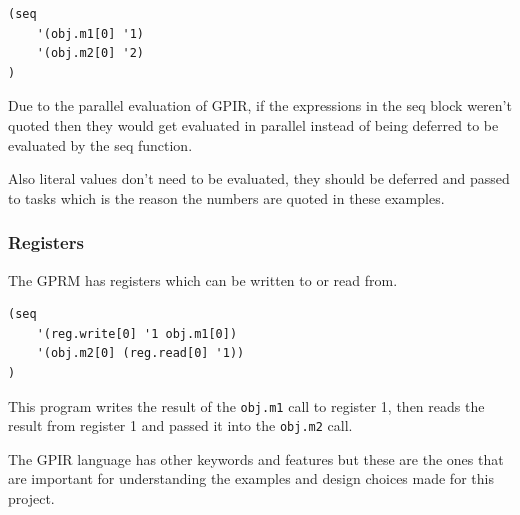\begin{lstlisting}[style=myGPIR]
(seq 
    '(obj.m1[0] '1)
    '(obj.m2[0] '2)
)
\end{lstlisting}

Due to the parallel evaluation of GPIR, if the expressions in the seq block weren't quoted then
they would get evaluated in parallel instead of being deferred to be evaluated by the seq function.

Also literal values don't need to be evaluated, they should be deferred and passed to tasks which is
the reason the numbers are quoted in these examples.

\subsubsection{Registers}

The GPRM has registers which can be written to or read from.

\begin{lstlisting}[style=myGPIR]
(seq
    '(reg.write[0] '1 obj.m1[0])
    '(obj.m2[0] (reg.read[0] '1))
)
\end{lstlisting}

This program writes the result of the \texttt{obj.m1} call to register 1,
then reads the result from register 1 and passed it into the \texttt{obj.m2} call.

The GPIR language has other keywords and features but these are the ones that are important for
understanding the examples and design choices made for this project.
